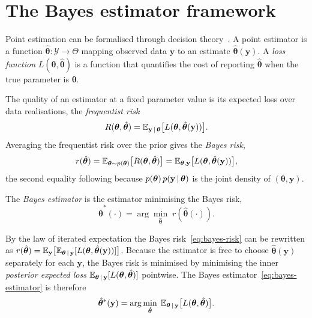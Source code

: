 \section{The Bayes estimator framework}
\label{sec:bayes-estimator}

Point estimation can be formalised through decision
theory~\citep{berger1985decision}. A point
estimator is a function $\hat{\bm{\theta}} : \mathcal{Y} \to \Theta$
mapping observed data $\mathbf{y}$ to an estimate
$\hat{\bm{\theta}}(\mathbf{y})$. A \emph{loss function}
$L(\bm{\theta}, \hat{\bm{\theta}})$ is a function that quantifies
the cost of reporting
$\hat{\bm{\theta}}$ when the true parameter is $\bm{\theta}$.

The quality of an estimator at a fixed parameter value is its expected
loss over data realisations, the \emph{frequentist risk}
%
\begin{equation}
  R(\bm{\theta}, \hat{\bm{\theta}})
  = \mathbb{E}_{\mathbf{y} \,|\, \bm{\theta}}
    \big[L(\bm{\theta}, \hat{\bm{\theta}}(\mathbf{y}))\big].
  \label{eq:frequentist-risk}
\end{equation}
%
Averaging the frequentist risk over the prior gives the \emph{Bayes
risk},
%
\begin{equation}
  r(\hat{\bm{\theta}})
  = \mathbb{E}_{\bm{\theta} \sim p(\bm{\theta})}
    \big[R(\bm{\theta}, \hat{\bm{\theta}})\big]
  = \mathbb{E}_{\bm{\theta}, \mathbf{y}}
    \big[L(\bm{\theta}, \hat{\bm{\theta}}(\mathbf{y}))\big],
  \label{eq:bayes-risk}
\end{equation}
%
the second equality following because $p(\bm{\theta})\,
p(\mathbf{y} \,|\, \bm{\theta})$ is the joint density of
$(\bm{\theta}, \mathbf{y})$.

\begin{definition}
\label{def:bayes-estimator}
The \emph{Bayes estimator} is the estimator minimising the Bayes risk,
%
\begin{equation}
  \hat{\bm{\theta}}^{*} (\cdot)
  = \arg\min_{\hat{\bm{\theta}}}\;
    r(\hat{\bm{\theta}} (\cdot)).
  \label{eq:bayes-estimator}
\end{equation}
\end{definition}

By the law of iterated expectation the Bayes
risk~\eqref{eq:bayes-risk} can be rewritten as
$r(\hat{\bm{\theta}}) = \mathbb{E}_{\mathbf{y}}\big[\mathbb{E}_{\bm{\theta} \,|\,
\mathbf{y}}[L(\bm{\theta}, \hat{\bm{\theta}}(\mathbf{y}))]\big]$.
Because the estimator is free to choose $\hat{\bm{\theta}}(\mathbf{y})$
separately for each $\mathbf{y}$, the Bayes risk is minimised by
minimising the inner \emph{posterior expected loss}
$\mathbb{E}_{\bm{\theta} \,|\, \mathbf{y}}[L(\bm{\theta},
\hat{\bm{\theta}})]$ pointwise. The Bayes estimator~\eqref{eq:bayes-estimator} is therefore
%
\begin{equation}
  \hat{\bm{\theta}}^{*}(\mathbf{y})
  = \arg\min_{\hat{\bm{\theta}}}\;
    \mathbb{E}_{\bm{\theta} \,|\, \mathbf{y}}
    \big[L(\bm{\theta}, \hat{\bm{\theta}})\big].
  \label{eq:pointwise}
\end{equation}

